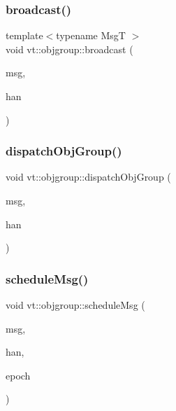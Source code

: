 \subsubsection{\texorpdfstring{broadcast()}{broadcast()}}
{\footnotesize\ttfamily template$<$typename MsgT $>$ \\
void vt\+::objgroup\+::broadcast (\begin{DoxyParamCaption}\item[{\hyperlink{namespacevt_ab2b3d506ec8e8d1540aede826d84a239}{Msg\+Shared\+Ptr}$<$ MsgT $>$}]{msg,  }\item[{\hyperlink{namespacevt_af64846b57dfcaf104da3ef6967917573}{Handler\+Type}}]{han }\end{DoxyParamCaption})}

\mbox{\label{namespacevt_1_1objgroup_a84e8b7c3ea793b3446eb95433bf02179}} 
\subsubsection{\texorpdfstring{dispatch\+Obj\+Group()}{dispatchObjGroup()}}
{\footnotesize\ttfamily void vt\+::objgroup\+::dispatch\+Obj\+Group (\begin{DoxyParamCaption}\item[{\hyperlink{namespacevt_a54674b9f819f4f3a652c6f78d9b62aaf}{Msg\+Virtual\+Ptr\+Any}}]{msg,  }\item[{\hyperlink{namespacevt_af64846b57dfcaf104da3ef6967917573}{Handler\+Type}}]{han }\end{DoxyParamCaption})}

\mbox{\label{namespacevt_1_1objgroup_a7beec0700b3e4d81e0ea31027b445ecf}} 
\subsubsection{\texorpdfstring{schedule\+Msg()}{scheduleMsg()}}
{\footnotesize\ttfamily void vt\+::objgroup\+::schedule\+Msg (\begin{DoxyParamCaption}\item[{\hyperlink{namespacevt_a54674b9f819f4f3a652c6f78d9b62aaf}{Msg\+Virtual\+Ptr\+Any}}]{msg,  }\item[{\hyperlink{namespacevt_af64846b57dfcaf104da3ef6967917573}{Handler\+Type}}]{han,  }\item[{\hyperlink{namespacevt_a985a5adf291c34a3ca263b3378388236}{Epoch\+Type}}]{epoch }\end{DoxyParamCaption})}

